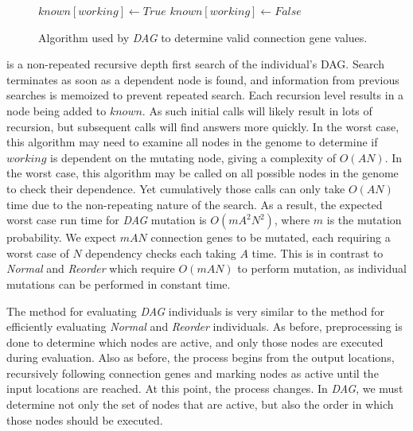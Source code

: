 \documentclass[journal]{IEEEtran}
\begin{document}
\begin{figure}
  \begin{algorithmic}
      \State{}
    \EndIf
        \State $known[working] \leftarrow True$
        \State{}
      \EndIf
    \EndFor
    \State $known[working] \leftarrow False$
    \State{}
  \EndProcedure
  \end{algorithmic}
  \caption{Algorithm used by \emph{DAG} to determine valid connection gene values.}
  \label{fig:dag}
\end{figure}

 is a non-repeated recursive depth
first search of the individual's DAG.  Search terminates as soon as a dependent
node is found, and information from previous searches is memoized to prevent
repeated search.  Each recursion level results in a node being added to $known$.
As such initial calls will likely result in lots of recursion, but subsequent
calls will find answers more quickly.  In the worst case, this algorithm may need
to examine all nodes in the genome to determine if $working$ is dependent on the
mutating node, giving  a complexity of $O(AN)$.  In the worst case, this algorithm
may be called on all possible nodes in the genome to check their dependence.
Yet cumulatively those calls can only take $O(AN)$ time due to the non-repeating
nature of the search.  As a result, the expected worst case run time for \emph{DAG}
mutation is $O(mA^2N^2)$, where $m$ is the mutation probability.  We expect $mAN$
connection genes to be mutated, each requiring a worst case of $N$ dependency checks
each taking $A$ time.
This is in contrast to \emph{Normal} and \emph{Reorder} which require $O(mAN)$ to perform
mutation, as individual mutations can be performed in constant time.

The method for evaluating \emph{DAG} individuals is very similar to the method for
efficiently evaluating \emph{Normal} and \emph{Reorder} individuals.  As before,
preprocessing is done to determine which nodes are active, and only those nodes are
executed during evaluation.  Also as before, the process begins from the output locations,
recursively following connection genes and marking nodes as active until the input locations
are reached.  At this point, the process changes.  In \emph{DAG}, we must determine not only the set of
nodes that are active, but also the order in which those nodes should be executed.
\end{document}

